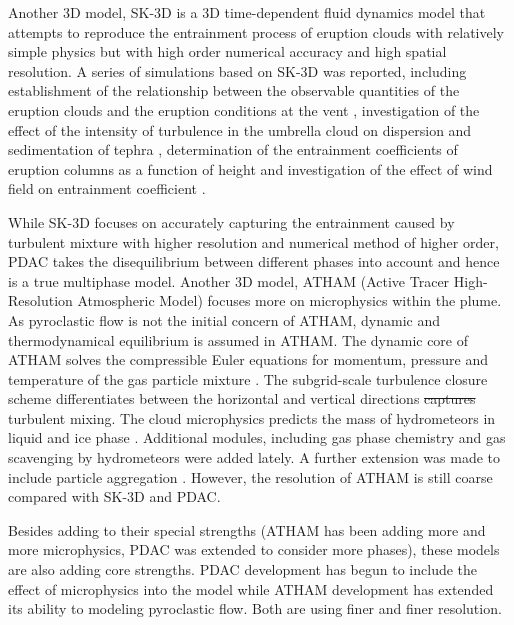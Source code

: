 \documentclass[gmd, manuscript]{copernicus} %
\providecommand{\DIFadd}[1]{{\protect\color{blue}\uwave{#1}}} %
\providecommand{\DIFdel}[1]{{\protect\color{red}\sout{#1}}}                      %
\providecommand{\DIFaddbegin}{} %
\providecommand{\DIFaddend}{} %
\providecommand{\DIFdelbegin}{} %
\providecommand{\DIFdelend}{} %
\begin{document}
Another 3D model, SK-3D \citep{suzuki2005numerical} is a 3D time-dependent fluid dynamics model that attempts to reproduce the entrainment process of eruption clouds with relatively simple physics but with high order numerical accuracy and high spatial resolution.
A series of simulations based on SK-3D was reported, including establishment of the relationship between the observable quantities of the eruption clouds and the eruption conditions at the vent \citep{suzuki2009three}, investigation of the effect of the intensity of turbulence in the umbrella cloud on dispersion and sedimentation of tephra \citep{koyaguchi2009effect}, determination of the entrainment coefficients of eruption columns as a function of height \citep{suzuki2010numerical} and investigation of the effect of wind field on entrainment coefficient \citep{suzuki20133d}. 

While SK-3D focuses on accurately capturing the entrainment caused by turbulent mixture with higher resolution and numerical method of higher order, PDAC takes the disequilibrium between different phases into account and hence is a true multiphase model. Another 3D model, ATHAM (Active Tracer High-Resolution Atmospheric Model) \citep{oberhuber1998volcanic} focuses more on microphysics within the plume. As pyroclastic flow is not the initial concern of ATHAM, dynamic and thermodynamical equilibrium is assumed in ATHAM. The dynamic core of ATHAM solves the compressible Euler equations for momentum, pressure and temperature of the gas particle mixture \citep{oberhuber1998volcanic}. The subgrid-scale turbulence closure scheme \DIFaddbegin \DIFadd{that }\DIFaddend differentiates between the horizontal and vertical directions \citep{herzog2003prognostic} \DIFdelbegin \DIFdel{captures }\DIFdelend \DIFaddbegin \DIFadd{is adopted to capture }\DIFaddend turbulent mixing. The cloud microphysics predicts the mass of hydrometeors in liquid and ice phase \citep{herzog1998effect}. Additional modules, including gas phase chemistry \citep{trentmann2002simulation} and gas scavenging by hydrometeors \citep{textor2003injection} were added lately. A further extension was made to include particle aggregation \citep{textor2006volcanic1, textor2006volcanic2}. However, the resolution of ATHAM is still coarse compared with SK-3D and PDAC.

Besides adding to their special strengths (ATHAM has been adding more and more microphysics, PDAC was extended to consider more phases), these models are also adding core strengths. PDAC development has begun to include the effect of microphysics into the model while ATHAM development has extended its ability to modeling pyroclastic flow. Both are using finer and finer resolution. 
\end{document}
